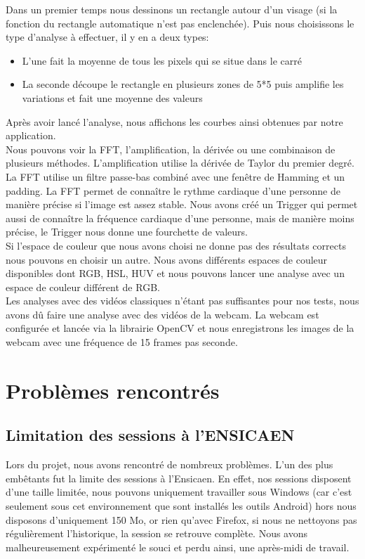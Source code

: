 Dans un premier temps nous dessinons un rectangle autour d'un visage (si la fonction du rectangle automatique n'est pas enclenchée).
Puis nous choisissons le type d'analyse à effectuer, il y en a deux types:
\begin{itemize}
	\item L'une fait la moyenne de tous les pixels qui se situe dans le carré
	\item La seconde découpe le rectangle en plusieurs zones de 5*5 puis amplifie les variations et fait une moyenne des valeurs
\end{itemize}
Après avoir lancé l'analyse, nous affichons les courbes ainsi obtenues par notre application.\\

Nous pouvons voir la FFT, l'amplification, la dérivée ou une combinaison de plusieurs méthodes.
L'amplification utilise la dérivée de Taylor du premier degré.
La FFT utilise un filtre passe-bas combiné avec une fenêtre de Hamming et un padding.
La FFT permet de connaître le rythme cardiaque d'une personne de manière précise si l'image est assez stable.
Nous avons créé un Trigger qui permet aussi de connaître la fréquence cardiaque d'une personne, mais de manière moins précise, le Trigger nous donne une fourchette de valeurs.\\

Si l'espace de couleur que nous avons choisi ne donne pas des résultats corrects nous pouvons en choisir un autre.
Nous avons différents espaces de couleur disponibles dont RGB, HSL, HUV et nous pouvons lancer une analyse avec un espace de couleur différent de RGB.\\

Les analyses avec des vidéos classiques n'étant pas suffisantes pour nos tests, nous avons dû faire une analyse avec des vidéos de la webcam.
La webcam est configurée et lancée via la librairie OpenCV et nous enregistrons les images de la webcam avec une fréquence de 15 frames pas seconde.\\

\section{Problèmes rencontrés}

\subsection{Limitation des sessions à l'ENSICAEN}

Lors du projet, nous avons rencontré de nombreux problèmes. L'un des plus embêtants fut la limite des sessions à l'Ensicaen. En effet, nos sessions disposent d'une taille limitée, nous
 pouvons uniquement travailler sous Windows (car c'est seulement sous cet environnement que sont installés les outils Android) hors nous disposons d'uniquement 150 Mo, or rien qu'avec
  Firefox, si nous ne nettoyons pas régulièrement l'historique, la session se retrouve complète. Nous avons malheureusement expérimenté le souci et perdu ainsi, une après-midi de travail.

